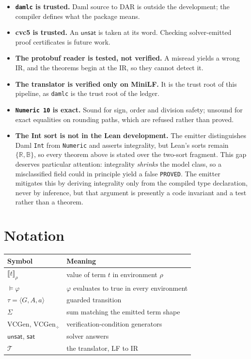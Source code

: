 \documentclass[11pt,a4paper]{article}
\newcommand{\seme}[2]{\llbracket #1 \rrbracket_{#2}}
\newcommand{\Bool}{\mathbb{B}}
\newcommand{\Real}{\mathbb{R}}
\newcommand{\VC}{\mathrm{VCGen}}
\newcommand{\VCd}{\mathrm{VCGen}_{\div}}
\newcommand{\unsat}{\mathsf{unsat}}
\newcommand{\sat}{\mathsf{sat}}
\newcommand{\code}[1]{\texttt{#1}}
\theoremstyle{definition}
\theoremstyle{plain}
\theoremstyle{remark}
\begin{document}
\begin{itemize}
  \item \textbf{\code{damlc} is trusted.} Daml source to DAR is outside the
        development; the compiler defines what the package means.
  \item \textbf{cvc5 is trusted.} An $\unsat$ is taken at its word. Checking
        solver-emitted proof certificates is future work.
  \item \textbf{The protobuf reader is tested, not verified.} A misread yields
        a wrong IR, and the theorems begin at the IR, so they cannot detect it.
  \item \textbf{The translator is verified only on MiniLF.} It is the trust
        root of this pipeline, as \code{damlc} is the trust root of the ledger.
  \item \textbf{\code{Numeric 10} is exact.} Sound for sign, order and division
        safety; unsound for exact equalities on rounding paths, which are
        refused rather than proved.
  \item \textbf{The Int sort is not in the Lean development.} The emitter
        distinguishes Daml \code{Int} from \code{Numeric} and asserts
        integrality, but Lean's sorts remain $\{\Real,\Bool\}$, so every
        theorem above is stated over the two-sort fragment. This gap deserves
        particular attention: integrality \emph{shrinks} the model class, so a
        misclassified field could in principle yield a false \code{PROVED}. The
        emitter mitigates this by deriving integrality only from the compiled
        type declaration, never by inference, but that argument is presently a
        code invariant and a test rather than a theorem.
\end{itemize}

\appendix
\section{Notation}

\begin{center}
\begin{tabular}{@{}ll@{}}
\toprule
Symbol & Meaning \\
\midrule
$\seme{t}{\rho}$              & value of term $t$ in environment $\rho$ \\
$\models \varphi$             & $\varphi$ evaluates to true in every environment \\
$\tau = \langle G,A,a\rangle$ & guarded transition \\
$\Sigma$                      & sum matching the emitted term shape \\
$\VC$, $\VCd$                 & verification-condition generators \\
$\unsat$, $\sat$              & solver answers \\
$\mathcal{T}$                 & the translator, LF to IR \\
\bottomrule
\end{tabular}
\end{center}
\end{document}
